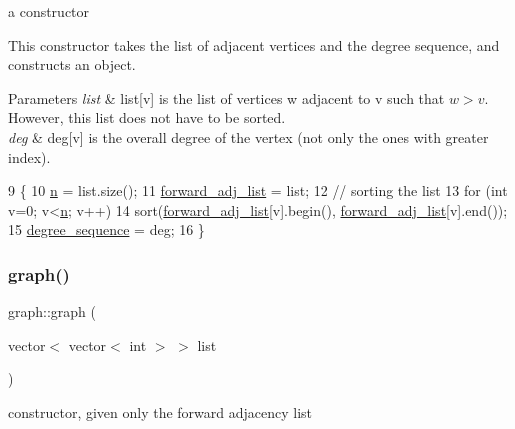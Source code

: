 a constructor 

This constructor takes the list of adjacent vertices and the degree sequence, and constructs an object. 
\begin{DoxyParams}{Parameters}
{\em list} & list\mbox{[}v\mbox{]} is the list of vertices w adjacent to v such that $w > v$. However, this list does not have to be sorted. \\
\hline
{\em deg} & deg\mbox{[}v\mbox{]} is the overall degree of the vertex (not only the ones with greater index). \\
\hline
\end{DoxyParams}

\begin{DoxyCode}
9                                                       \{
10   \hyperlink{classgraph_ac8b3474ce95c04087c312508ec1443b6}{n} = list.size();
11   \hyperlink{classgraph_a7d6441850d586d6a99fb73df57b70362}{forward\_adj\_list} = list;
12   \textcolor{comment}{// sorting the list}
13   \textcolor{keywordflow}{for} (\textcolor{keywordtype}{int} v=0; v<\hyperlink{classgraph_ac8b3474ce95c04087c312508ec1443b6}{n}; v++)
14     sort(\hyperlink{classgraph_a7d6441850d586d6a99fb73df57b70362}{forward\_adj\_list}[v].begin(), \hyperlink{classgraph_a7d6441850d586d6a99fb73df57b70362}{forward\_adj\_list}[v].end());
15   \hyperlink{classgraph_a0b31295672bfe37669c9eb3640977fe6}{degree\_sequence} = deg;
16 \}
\end{DoxyCode}
\mbox{\label{classgraph_afad830c445cfc831ee37eb755170a4a7}} 
\subsubsection{\texorpdfstring{graph()}{graph()}\hspace{0.1cm}{\footnotesize\ttfamily [2/2]}}
{\footnotesize\ttfamily graph\+::graph (\begin{DoxyParamCaption}\item[{vector$<$ vector$<$ int $>$ $>$}]{list }\end{DoxyParamCaption})}



constructor, given only the forward adjacency list 

